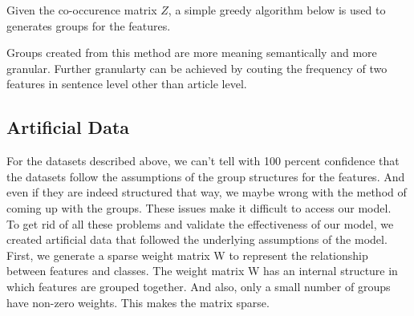\documentclass[11pt]{article}
\begin{document}
Given the co-occurence matrix $Z$, a simple greedy algorithm below is used to generates groups for the features.

\begin{algorithm}
\end{algorithm}

Groups created from this method are more meaning semantically and more granular. Further granularty can be achieved by couting the frequency of two features in sentence level other than article level.\\

\subsection{Artificial Data}

For the datasets described above, we can't tell with 100 percent confidence that the datasets follow the assumptions of the group structures for the features. And even if they are indeed structured that way, we maybe wrong with the method of coming up with the groups. These issues make it difficult to access our model.\\ 

To get rid of all these problems and validate the effectiveness of our model, we created artificial data that followed the underlying assumptions of the model. First, we generate a sparse weight matrix W to represent the relationship between features and classes. The weight matrix W has an internal structure in which features are grouped together. And also, only a small number of groups have non-zero weights. This makes the matrix sparse.\\ 
\end{document}

